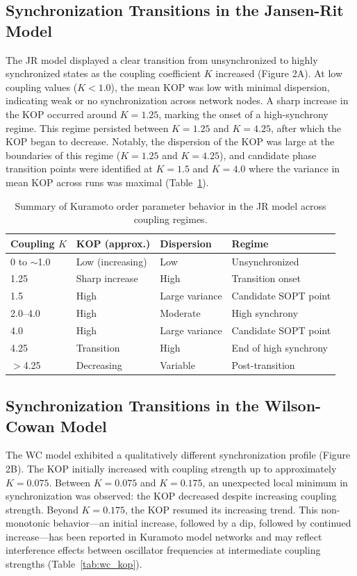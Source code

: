 \documentclass[12pt]{article}
\begin{document}
\subsection{Synchronization Transitions in the Jansen-Rit Model}

The JR model displayed a clear transition from unsynchronized to highly synchronized states as the coupling coefficient $K$ increased (Figure 2A). At low coupling values ($K < 1.0$), the mean KOP was low with minimal dispersion, indicating weak or no synchronization across network nodes. A sharp increase in the KOP occurred around $K = 1.25$, marking the onset of a high-synchrony regime. This regime persisted between $K = 1.25$ and $K = 4.25$, after which the KOP began to decrease. Notably, the dispersion of the KOP was large at the boundaries of this regime ($K = 1.25$ and $K = 4.25$), and candidate phase transition points were identified at $K = 1.5$ and $K = 4.0$ where the variance in mean KOP across runs was maximal (Table~\ref{tab:jr_kop}).

\begin{table}[H]
\centering
\caption{Summary of Kuramoto order parameter behavior in the JR model across coupling regimes.}
\label{tab:jr_kop}
\begin{tabular}{llll}
\toprule
Coupling $K$ & KOP (approx.) & Dispersion & Regime \\
\midrule
0 to $\sim$1.0 & Low (increasing) & Low & Unsynchronized \\
1.25 & Sharp increase & High & Transition onset \\
1.5 & High & Large variance & Candidate SOPT point \\
2.0--4.0 & High & Moderate & High synchrony \\
4.0 & High & Large variance & Candidate SOPT point \\
4.25 & Transition & High & End of high synchrony \\
$>$4.25 & Decreasing & Variable & Post-transition \\
\bottomrule
\end{tabular}
\end{table}

\subsection{Synchronization Transitions in the Wilson-Cowan Model}

The WC model exhibited a qualitatively different synchronization profile (Figure 2B). The KOP initially increased with coupling strength up to approximately $K = 0.075$. Between $K = 0.075$ and $K = 0.175$, an unexpected local minimum in synchronization was observed: the KOP decreased despite increasing coupling strength. Beyond $K = 0.175$, the KOP resumed its increasing trend. This non-monotonic behavior---an initial increase, followed by a dip, followed by continued increase---has been reported in Kuramoto model networks and may reflect interference effects between oscillator frequencies at intermediate coupling strengths (Table~\ref{tab:wc_kop}).
\end{document}
